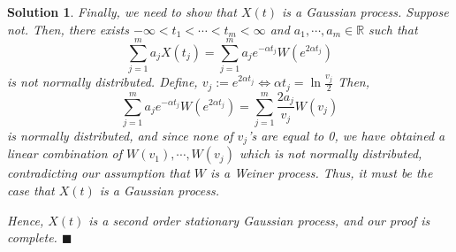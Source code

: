 \documentclass[12pt]{article}
\theoremstyle{problemstyle}
\newtheorem*{solution*}{Solution}
\newcommand{\R}{\mathbb{R}}
\begin{document}
\begin{solution*}
Finally, we need to show that $X(t)$ is a Gaussian process. Suppose not. Then, there exists $-\infty<t_1<\cdots<t_m<\infty$ and $a_1,\cdots,a_m\in\R$ such that $$\sum_{j=1}^m a_j X(t_j) = \sum_{j = 1}^m a_je^{-\alpha t_j}W(e^{2\alpha t_j})$$ is not normally distributed. Define, $v_j := e^{2\alpha t_j}\Longleftrightarrow \alpha t_j = \ln \frac{v_j}{2}$ Then, 
$$\sum_{j = 1}^m a_je^{-\alpha t_j}W(e^{2\alpha t_j}) = \sum_{j = 1}^m \dfrac{2a_j}{v_j} W(v_j) $$ is normally distributed, and since none of $v_j$'s are equal to 0, we have obtained a linear combination of $W(v_1),\cdots, W(v_j)$ which is not normally distributed, contradicting our assumption that $W$ is a Weiner process. Thus, it must be the case that $X(t)$ is a Gaussian process. 

Hence, $X(t)$ is a second order stationary Gaussian process, and our proof is complete. \hfill $\blacksquare$

\end{solution*}

\newpage



\end{document}
